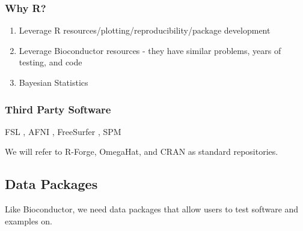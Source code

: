 \documentclass[]{elsarticle} %
\providecommand{\tightlist}{%
  \setlength{\itemsep}{0pt}\setlength{\parskip}{0pt}}
\begin{document}

\subsubsection{Why R?}\label{why-r}

\begin{enumerate}
\def\labelenumi{\arabic{enumi}.}
\setcounter{enumi}{2}
\tightlist
\item
  Leverage R resources/plotting/reproducibility/package development
\item
  Leverage Bioconductor resources - they have similar problems, years of
  testing, and code
\item
  Bayesian Statistics
\end{enumerate}

\subsubsection{Third Party Software}\label{third-party-software}

FSL \citep{fsl}, AFNI \citep{afni}, FreeSurfer \citep{freesurfer}, SPM \citep{spm}


We will refer to R-Forge, OmegaHat, and CRAN as standard
repositories.



\subsection{Data Packages}\label{data-packages}

Like Bioconductor, we need data packages that allow users to test
software and examples on.




%
%
\end{document}
